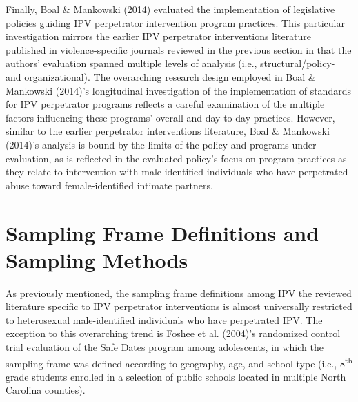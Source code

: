 \documentclass[11pt,]{tufte-book}
\begin{document}
Finally, Boal \& Mankowski (2014) evaluated the implementation of
legislative policies guiding IPV perpetrator intervention program
practices. This particular investigation mirrors the earlier IPV
perpetrator interventions literature published in violence-specific
journals reviewed in the previous section in that the authors'
evaluation spanned multiple levels of analysis (i.e., structural/policy-
and organizational). The overarching research design employed in Boal \&
Mankowski (2014)'s longitudinal investigation of the implementation of
standards for IPV perpetrator programs reflects a careful examination of
the multiple factors influencing these programs' overall and day-to-day
practices. However, similar to the earlier perpetrator interventions
literature, Boal \& Mankowski (2014)'s analysis is bound by the limits
of the policy and programs under evaluation, as is reflected in the
evaluated policy's focus on program practices as they relate to
intervention with male-identified individuals who have perpetrated abuse
toward female-identified intimate partners.

\section{Sampling Frame Definitions and Sampling
Methods}\label{sampling-frame-definitions-and-sampling-methods}

As previously mentioned, the sampling frame definitions among IPV the
reviewed literature specific to IPV perpetrator interventions is almost
universally restricted to heterosexual male-identified individuals who
have perpetrated IPV. The exception to this overarching trend is Foshee
et al. (2004)'s randomized control trial evaluation of the Safe Dates
program among adolescents, in which the sampling frame was defined
according to geography, age, and school type (i.e.,
8\textsuperscript{th} grade students enrolled in a selection of public
schools located in multiple North Carolina counties).
\end{document}
